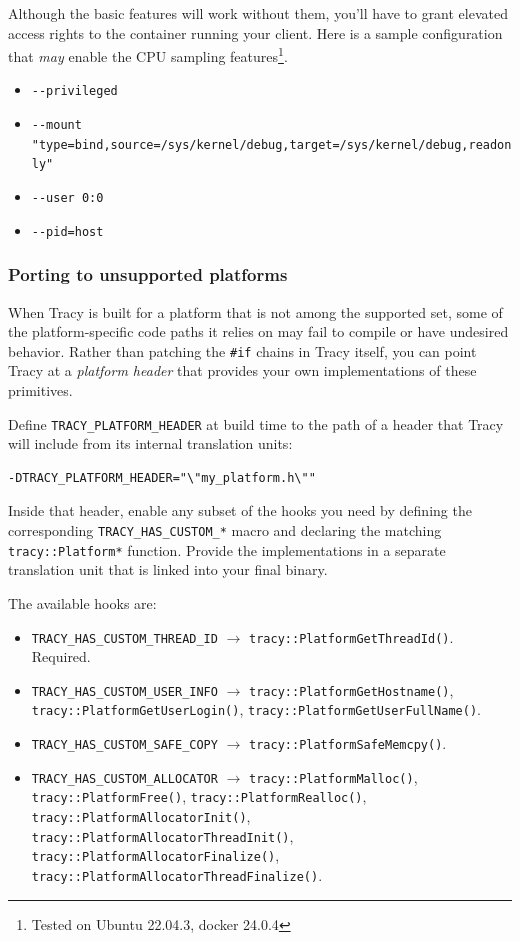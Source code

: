 \documentclass[hidelinks,titlepage,a4paper,twoside]{article}
\begin{document}
Although the basic features will work without them, you'll have to grant elevated access rights to the container running your client. Here is a sample configuration that \textit{may} enable the CPU sampling features\footnote{Tested on Ubuntu 22.04.3, docker 24.0.4}.
\begin{itemize}
    \item \texttt{-{}-privileged}
    \item \texttt{-{}-mount "type=bind,source=/sys/kernel/debug,target=/sys/kernel/debug,readonly"}
    \item \texttt{-{}-user 0:0}
    \item \texttt{-{}-pid=host}
\end{itemize}

\subsubsection{Porting to unsupported platforms}
\label{customplatform}

When Tracy is built for a platform that is not among the supported set, some of the platform-specific code paths it relies on may fail to compile or have undesired behavior. Rather than patching the \texttt{\#if} chains in Tracy itself, you can point Tracy at a \emph{platform header} that provides your own implementations of these primitives.

Define \texttt{TRACY\_PLATFORM\_HEADER} at build time to the path of a header that Tracy will include from its internal translation units:

\begin{lstlisting}
-DTRACY_PLATFORM_HEADER="\"my_platform.h\""
\end{lstlisting}

Inside that header, enable any subset of the hooks you need by defining the corresponding \texttt{TRACY\_HAS\_CUSTOM\_*} macro and declaring the matching \texttt{tracy::Platform*} function. Provide the implementations in a separate translation unit that is linked into your final binary.

The available hooks are:

\begin{itemize}
\item \texttt{TRACY\_HAS\_CUSTOM\_THREAD\_ID} $\rightarrow$ \texttt{tracy::PlatformGetThreadId()}. Required.
\item \texttt{TRACY\_HAS\_CUSTOM\_USER\_INFO} $\rightarrow$ \texttt{tracy::PlatformGetHostname()}, \texttt{tracy::PlatformGetUserLogin()}, \texttt{tracy::PlatformGetUserFullName()}.
\item \texttt{TRACY\_HAS\_CUSTOM\_SAFE\_COPY} $\rightarrow$ \texttt{tracy::PlatformSafeMemcpy()}.
\item \texttt{TRACY\_HAS\_CUSTOM\_ALLOCATOR} $\rightarrow$ \texttt{tracy::PlatformMalloc()}, \texttt{tracy::PlatformFree()}, \texttt{tracy::PlatformRealloc()}, \texttt{tracy::PlatformAllocatorInit()}, \texttt{tracy::PlatformAllocatorThreadInit()}, \texttt{tracy::PlatformAllocatorFinalize()}, \texttt{tracy::PlatformAllocatorThreadFinalize()}.
\end{itemize}
\end{document}
